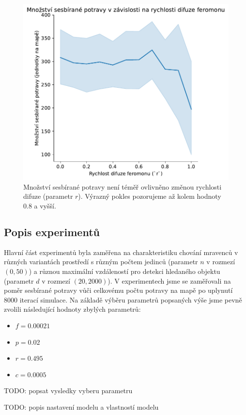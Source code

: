 \documentclass[10pt,a4paper,twocolumn]{article}
\begin{document}
\begin{figure}[tb]
  \centering
  \includegraphics[width=0.9\linewidth]{images/grid_search_2_difusion.pdf}
  \caption{Množství sesbírané potravy není téměř ovlivněno změnou rychlosti 
  difuze (parametr $r$). Výrazný pokles pozorujeme až kolem hodnoty $0.8$ 
  a vyšší.}
  \label{fig:grid_search_2_difusion}
\end{figure}


\subsection{Popis experimentů}
\label{subsec:experiment_describtion} 
Hlavní část experimentů byla zaměřena na charakteristiku chování mravenců v
různých variantách prostředí s různým počtem jedinců (parametr $n$ v rozmezí 
$(0, 50)$) a různou maximální vzdáleností pro detekci hledaného objektu 
(parametr $d$ v rozmezí $(20, 2000)$). V experimentech jsme se zaměřovali 
na poměr sesbírané potravy vůči celkovému počtu potravy na mapě po uplynutí
$8000$ iterací simulace. Na základě výběru parametrů popsaných výše jsme 
pevně zvolili následující hodnoty zbylých parametrů:

\begin{itemize}
  \item $f = 0.00021$
  \item $p = 0.02$
  \item $r = 0.495$
  \item $c = 0.0005$
\end{itemize}


TODO: popsat vysledky vyberu parametru

TODO: popis nastavení modelu a vlastností modelu




\end{document}
